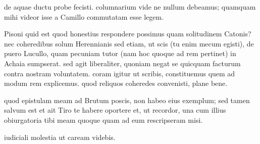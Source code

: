 


 de aquae ductu probe fecisti. columnarium vide ne nullum debeamus; quamquam mihi videor isse a Camillo commutatam esse legem.

 Pisoni quid est quod honestius respondere possimus quam solitudinem Catonis? nec coheredibus solum Herennianis sed etiam, ut scis (tu enim mecum egisti), de puero Lucullo, quam pecuniam tutor (nam hoc quoque ad rem pertinet) in Achaia sumpserat. sed agit liberaliter, quoniam negat se quicquam facturum contra nostram voluntatem. coram igitur ut scribis, constituemus quem ad modum rem explicemus. quod reliquos coheredes convenisti, plane bene.

 quod epistulam meam ad Brutum poscis, non habeo eius exemplum; sed tamen salvum est et ait Tiro te habere oportere et, ut recordor, una cum illius obiurgatoria tibi meam quoque quam ad eum rescripseram misi.

 iudiciali molestia ut caream videbis.
